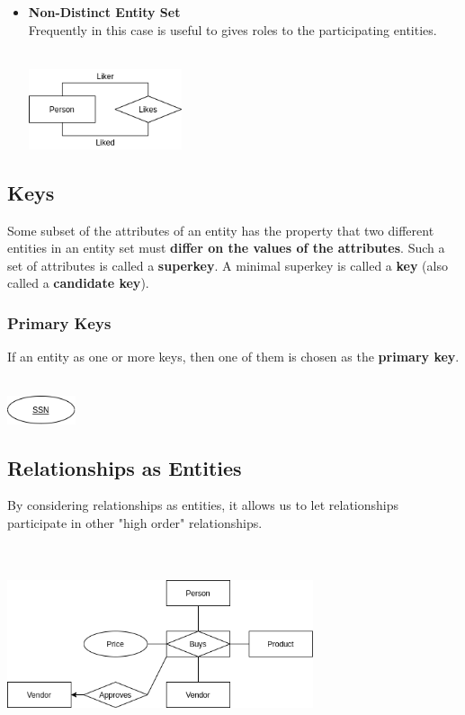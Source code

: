 \documentclass{article}
\begin{document}
\begin{itemize}
	\item \textbf{Non-Distinct Entity Set}
	\vspace{.2cm} \\
	Frequently in this case is useful to gives roles to the participating entities. \\ \\
	
	\centerline{\includegraphics[width=4.5cm]{./assets/nondistinct.png}}
	\vspace{.6cm}
\end{itemize}

\subsection{Keys}
Some subset of the attributes of an entity has the property that two different entities in an entity set must \textbf{differ on the values of the attributes}. Such a set of attributes is called a \textbf{superkey}. A minimal superkey is called a \textbf{key} (also called a \textbf{candidate key}).

\subsubsection{Primary Keys}
If an entity as one or more keys, then one of them is chosen as the \textbf{primary key}. \\ \\

\centerline{\includegraphics[width=2cm]{./assets/key.png}}

\subsection{Relationships as Entities}
By considering relationships as entities, it allows us to let relationships participate in other "high order" relationships. \\ \\ \\

\centerline{\includegraphics[width=9cm]{./assets/rel-ent.png}}
\vspace{.6cm}
\end{document}
